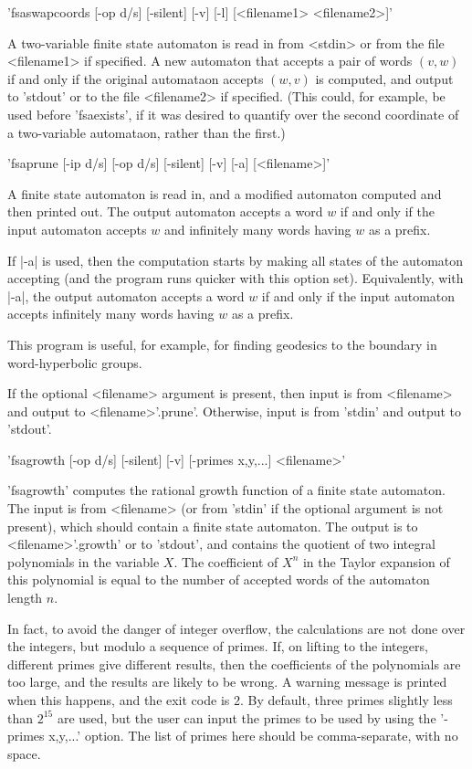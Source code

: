 'fsaswapcoords [-op d/s] [-silent] [-v] [-l] [<filename1> <filename2>]'

A two-variable finite state automaton is read in from <stdin> or from
the file <filename1> if specified. A new automaton that accepts a pair of
words $(v,w)$ if and only if the original automataon accepts $(w,v)$ is
computed, and output to 'stdout' or to the file <filename2> if specified.
(This could, for example, be used before 'fsaexists', if it was desired to
quantify over the second coordinate of a two-variable automataon, rather
than the first.)


'fsaprune [-ip d/s] [-op d/s] [-silent] [-v] [-a] [<filename>]'

A finite state automaton is read in, and a modified automaton computed
and then printed out. The output automaton accepts a word $w$ if and
only if the input automaton accepts $w$ and infinitely many words having
$w$ as a prefix.

If |-a| is used, then the computation starts by making all states of the
automaton accepting (and the program runs quicker with this option set).
Equivalently, with |-a|, the output automaton accepts a word $w$ if and
only if the input automaton accepts infinitely many words having
$w$ as a prefix.

This program is useful, for example, for finding geodesics to the boundary in
word-hyperbolic groups.

If the optional <filename> argument is present, then input is from <filename>
and output to <filename>'.prune'. Otherwise, input is from 'stdin' and
output to 'stdout'.


'fsagrowth [-op d/s] [-silent] [-v] [-primes x,y,...] <filename>'

'fsagrowth' computes the rational growth function of a finite state automaton.
The input is from <filename> (or from 'stdin' if the optional argument is not
present), which should contain a finite state automaton.
The output is to <filename>'.growth' or to 'stdout', and contains the quotient
of two integral polynomials in the variable $X$. The coefficient  of $X^n$ in
the Taylor expansion of this polynomial is equal to the number of accepted
words of the automaton length $n$.

In fact, to avoid the danger of integer overflow, the calculations are not done
over the integers, but modulo a sequence of primes. If, on lifting to the
integers, different primes give different results, then the coefficients of
the polynomials are too large, and the results are likely to be wrong.
A warning message is printed when this happens, and the exit code is 2.
By default, three primes slightly less than $2^{15}$ are used, but the
user can input the primes to be used by using the '-primes x,y,...' option.
The list of primes here should be comma-separate, with no space.

